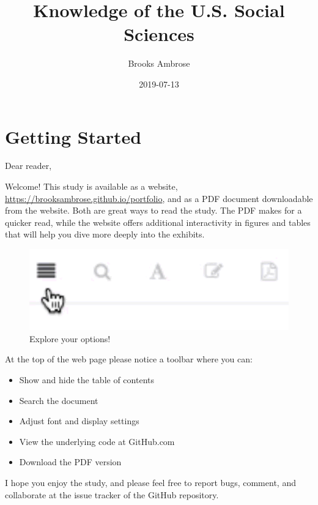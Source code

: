 \documentclass[]{book}
\title{Knowledge of the U.S. Social Sciences}
\author{Brooks Ambrose}
\date{2019-07-13}
\providecommand{\tightlist}{%
  \setlength{\itemsep}{0pt}\setlength{\parskip}{0pt}}
\theoremstyle{definition}
\theoremstyle{definition}
\theoremstyle{definition}
\theoremstyle{remark}
\begin{document}
\maketitle

{
\setcounter{tocdepth}{2}
\tableofcontents
}
\listoftables
\listoffigures
\hypertarget{getting-started}{%
\chapter*{Getting Started}\label{getting-started}}


Dear reader,

Welcome! This study is available as a website,
\url{https://brooksambrose.github.io/portfolio}, and as a PDF document
downloadable from the website. Both are great ways to read the study.
The PDF makes for a quicker read, while the website offers additional
interactivity in figures and tables that will help you dive more deeply
into the exhibits.

\begin{figure}

{\centering \includegraphics[width=6.94in]{img/toolbar} 

}

\caption{Explore your options!}\label{fig:toolbar}
\end{figure}

At the top of the web page please notice a toolbar where you can:

\begin{itemize}
\tightlist
\item
  Show and hide the table of contents
\item
  Search the document
\item
  Adjust font and display settings
\item
  View the underlying code at GitHub.com
\item
  Download the PDF version
\end{itemize}

I hope you enjoy the study, and please feel free to report bugs,
comment, and collaborate at the issue tracker of the GitHub repository.
\end{document}
